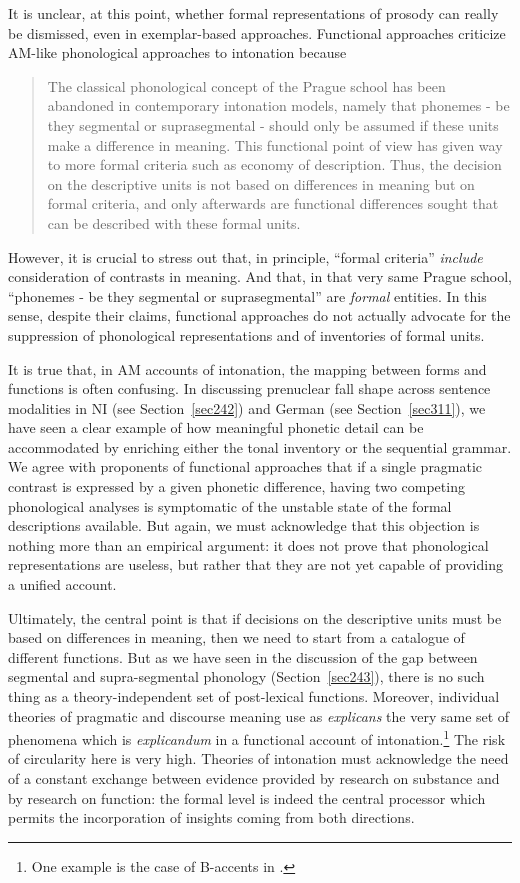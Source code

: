 It is unclear, at this point, whether formal representations of prosody can really be dismissed, even in exemplar-based approaches. Functional approaches criticize AM-like phonological approaches to intonation because \begin{quote}The classical phonological concept of the Prague school has been abandoned in contemporary intonation models, namely that phonemes - be they segmental or suprasegmental - should only be assumed if these units make a difference in meaning. This functional point of view has given way to more formal criteria such as economy of description. Thus, the decision on the descriptive units is not based on differences in meaning but on formal criteria, and only afterwards are functional differences sought that can be described with these formal units. \cite[§1.1]{batliner2005prosodic}\end{quote}
However, it is crucial to stress out that, in principle, ``formal criteria'' \textit{include} consideration of contrasts in meaning. And that, in that very same Prague school, ``phonemes - be they segmental or suprasegmental'' are \textit{formal} entities. In this sense, despite their claims, functional approaches do not actually advocate for the suppression of phonological representations and of inventories of formal units. 

It is true that, in AM accounts of intonation, the mapping between forms and functions is often confusing. In discussing prenuclear fall shape across sentence modalities in NI (see Section~\ref{sec242}) and German (see Section~\ref{sec311}), we have seen a clear example of how meaningful phonetic detail can be accommodated by enriching either the tonal inventory or the sequential grammar. We agree with proponents of functional approaches that if a single pragmatic contrast is expressed by a given phonetic difference, having two competing phonological analyses is symptomatic of the unstable state of the formal descriptions available. But again, we must acknowledge that this objection is nothing more than an empirical argument: it does not prove that phonological representations are useless, but rather that they are not yet capable of providing a unified account. 

Ultimately, the central point is that if decisions on the descriptive units must be based on differences in meaning, then we need to start from a catalogue of different functions. But as we have seen in the discussion of the gap between segmental and supra-segmental phonology (Section~\ref{sec243}), there is no such thing as a theory-independent set of post-lexical functions. Moreover, individual theories of pragmatic and discourse meaning use as \textit{explicans} the very same set of phenomena which is \textit{explicandum} in a functional account of intonation.\footnote{One example is the case of B-accents in \citet{jackendoff1972semantic}.} The risk of circularity here is very high. Theories of intonation must acknowledge the need of a constant exchange between evidence provided by research on substance and by research on function: the formal level is indeed the central processor which permits the incorporation of insights coming from both directions.

